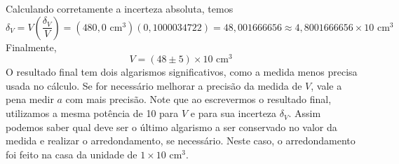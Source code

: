 Calculando corretamente a incerteza absoluta, temos
\[
\delta_V=  V\left(\frac{\delta_V}{  V}\right)= (480,\!0\mbox{ cm}^3)( 0,\!1000034722) = 48,001666656 \approx 4,8001666656 \times 10  \mbox{ cm}^3
\]
Finalmente,
\[
V = (48\pm 5) \times 10 \mbox{ cm}^3\;
\]
O resultado final tem dois algarismos significativos, como a medida menos precisa usada no cálculo. Se for necessário melhorar a precisão da medida de $V$, vale a pena medir $a$ com mais precisão. Note que ao escrevermos o resultado final, utilizamos a mesma potência de 10 para $V$ e para sua incerteza $\delta_V$. Assim podemos saber qual deve ser o último algarismo a ser conservado no valor da medida e realizar o arredondamento, se necessário. Neste caso, o arredondamento foi feito na casa da unidade de $1\times 10 \mbox{ cm}^3$.
%




